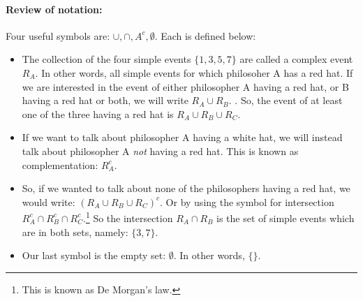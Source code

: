 \documentclass[14pt]{extarticle}
\begin{document}
\paragraph{Review of notation:}  Four useful symbols are:  $\cup, \cap, A^c,
  \emptyset$.\label{def:emptyset}  Each is defined below:
\begin{itemize}
\item The collection of the four simple
events $\{1,3,5,7\}$ are called a complex event $R_A$.  In other
words, all simple events for which philosoher A has a red hat.  If we
are interested in the event of either philosopher A having a red hat, or
B having a red hat or both, we will write $R_A \cup R_B$.
\label{def:union}.  So, the event of at least one of the three having
a red hat is $R_A \cup R_B \cup R_C$.  
\item If we want to talk about philosopher A having a white hat, we
  will instead talk about philosopher A {\it not} having a red hat.
  This is known as complementation: $R_A^c$.
\item So, if we wanted to talk about none of the philosophers having a
  red hat, we would write: $(R_A \cup R_B \cup R_C)^c$.  Or by using
  the symbol for intersection $R_A^c \cap R_B^c \cap
  R_C^c$.\footnote{This is known as De Morgan's law.}  So the
  intersection $R_A \cap R_B$ is the set of simple events which are in
  both sets, namely: $\{3,7\}$.\label{def:intersection}
\item Our last symbol is the empty set: $\emptyset$.  In other words,
  $\{ \}$. 
\end{itemize}
\end{document}
